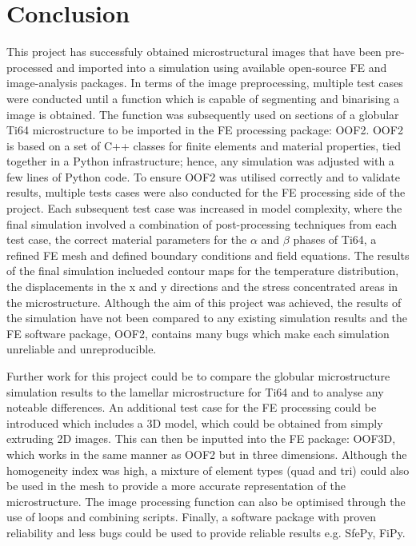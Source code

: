 \documentclass[report.tex]{subfiles}
\begin{document}
\section{Conclusion}

\noindent This project has successfuly obtained microstructural images that have been pre-processed and imported into a simulation using available open-source FE and image-analysis packages. In terms of the image preprocessing, multiple test cases were conducted until a function which is capable of segmenting and binarising a image is obtained. The function was subsequently used on sections of a globular Ti64 microstructure to be imported in the FE processing package: OOF2. OOF2 is based on a set of C++ classes for finite elements and material properties, tied together in a Python infrastructure; hence, any simulation was adjusted with a few lines of Python code. To ensure OOF2 was utilised correctly and to validate results, multiple tests cases were also conducted for the FE processing side of the project. Each subsequent test case was increased in model complexity, where the final simulation involved a combination of post-processing techniques from each test case, the correct material parameters for the $\alpha$ and $\beta$ phases of Ti64, a refined FE mesh and defined boundary conditions and  field equations. The results of the final simulation inclueded contour maps for the temperature distribution, the displacements in the x and y directions and the stress concentrated areas in the microstructure. Although the aim of this  project was achieved, the results of the simulation have not been compared to any existing simulation results and the FE software package, OOF2, contains many bugs which make each simulation unreliable and unreproducible. \newline
 
\noindent Further work for this project could be to compare the globular microstructure simulation results to the lamellar microstructure for Ti64 and to analyse any noteable differences. An additional test case for the FE processing could be introduced which includes a 3D model, which could be obtained from simply extruding 2D images. This can then be inputted into the FE package: OOF3D, which works in the same manner as OOF2 but in three dimensions. Although the homogeneity index was high, a mixture of element types (quad and tri) could also be used in the mesh to provide a more accurate representation of the microstructure. The image processing function can also be optimised through the use of loops and combining scripts. Finally, a software package with proven reliability and less bugs could be used to provide reliable results e.g. SfePy, FiPy.
 
\end{document}
